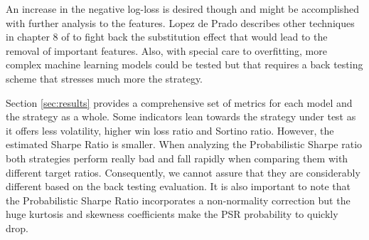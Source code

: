 An increase in the negative log-loss is desired though and might be accomplished with further
analysis to the features. Lopez de Prado describes other techniques in chapter
8 of \cite{lopez_de_prado} to fight back the substitution effect that would lead
to the removal of important features. Also, with special care to overfitting, 
more complex machine learning models could be tested but that requires a back
testing scheme that stresses much more the strategy.

Section \ref{sec:results} provides a comprehensive set of metrics for each model
and the strategy as a whole. Some indicators lean towards
the strategy under test as it offers less volatility, higher win loss ratio
and Sortino ratio. However, the estimated Sharpe Ratio is smaller. When analyzing
the Probabilistic Sharpe ratio both strategies perform really bad and fall
rapidly when comparing them with different target ratios. Consequently, we 
cannot assure that they are considerably different based on the back testing evaluation.
It is also important to note that the Probabilistic Sharpe Ratio incorporates
a non-normality correction but the huge kurtosis and skewness coefficients make
the PSR probability to quickly drop.
